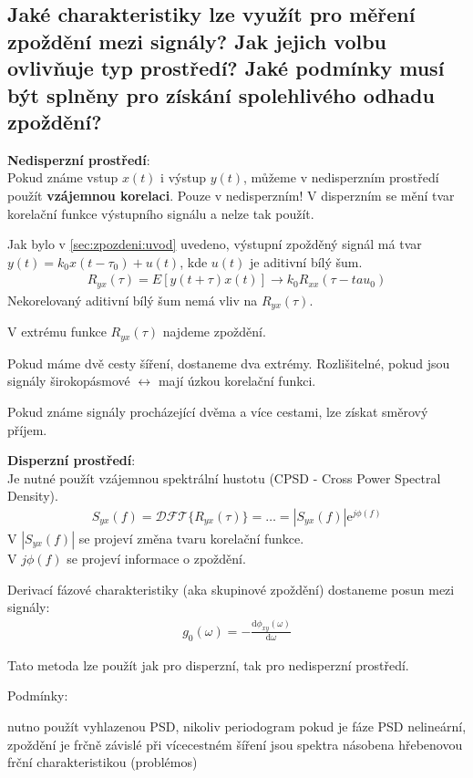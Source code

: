 \documentclass[a4paper,12pt]{article}   %
\newcommand{\mt}[1]{$#1$}
\newcommand{\e}{\text{e}}
\newcommand{\dd}{\text{d}}
\begin{document}
\subsection{Jaké charakteristiky lze využít pro měření zpoždění mezi signály? Jak jejich volbu ovlivňuje typ prostředí? Jaké podmínky musí být splněny pro získání spolehlivého odhadu zpoždění?}\label{sec:zpozdeni:zpusoby}

\textbf{Nedisperzní prostředí}:\\
Pokud známe vstup \mt{x(t)} i výstup \mt{y(t)}, můžeme v nedisperzním prostředí použít \textbf{vzájemnou korelaci}. Pouze v nedisperzním! V disperzním se mění tvar korelační funkce výstupního signálu a nelze tak použít. 

Jak bylo v \ref{sec:zpozdeni:uvod} uvedeno, výstupní zpožděný signál má tvar \mt{y(t) = k_0 x (t-\tau_0) + u(t)}, kde \mt{u(t)} je aditivní bílý šum.
\begin{align*}
        R_{yx}(\tau) = E[y(t+\tau)x(t)] \rightarrow k_0R_{xx}(\tau-tau_0)
\end{align*}
Nekorelovaný aditivní bílý šum nemá vliv na \mt{R_{yx}(\tau)}.

V extrému funkce \mt{R_{yx}(\tau)} najdeme zpoždění.

Pokud máme dvě cesty šíření, dostaneme dva extrémy. Rozlišitelné, pokud jsou signály širokopásmové \mt{\leftrightarrow} mají úzkou korelační funkci.

Pokud známe signály procházející dvěma a více cestami, lze získat směrový příjem.

\textbf{Disperzní prostředí}:\\
Je nutné použít vzájemnou spektrální hustotu (CPSD - Cross Power Spectral Density).
\begin{align*}
        S_{yx}(f) = \mathscr{DFT}\{R_{yx}(\tau)\} = \dots = |S_{yx}(f)|\e^{j\phi(f)}
\end{align*}
V \mt{|S_{yx}(f)|} se projeví změna tvaru korelační funkce.\\
V \mt{{j\phi(f)}} se projeví informace o zpoždění. 

Derivací fázové charakteristiky (aka skupinové zpoždění) dostaneme posun mezi signály:
\begin{align*}
        g_0(\omega) = -\frac{\dd \phi_{xy}(\omega)}{\dd \omega}
\end{align*}

Tato metoda lze použít jak pro disperzní, tak pro nedisperzní prostředí.

Podmínky:
\begin{outline}
        \1 nutno použít vyhlazenou PSD, nikoliv periodogram
        \1 pokud je fáze PSD nelineární, zpoždění je frčně závislé
        \1 při vícecestném šíření jsou spektra násobena hřebenovou frční charakteristikou (problémos)
\end{outline}
\end{document}
